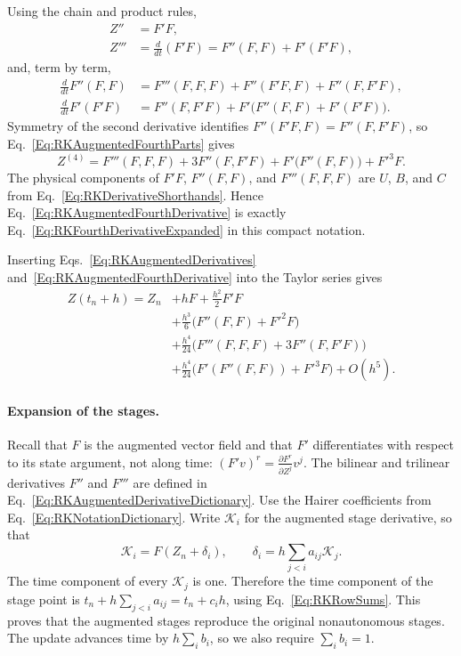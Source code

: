 Using the chain and product rules,
\begin{align}
 Z''&=F'F,\nonumber\\
 Z'''&=\frac{d}{dt}(F'F)=F''(F,F)+F'(F'F),\label{Eq:RKAugmentedDerivatives}
\end{align}
and, term by term,
\begin{align}
 \frac{d}{dt}F''(F,F)
 &=F'''(F,F,F)+F''(F'F,F)+F''(F,F'F),\nonumber\\
 \frac{d}{dt}F'(F'F)
 &=F''(F,F'F)+F'\bigl(F''(F,F)+F'(F'F)\bigr).
 \label{Eq:RKAugmentedFourthParts}
\end{align}
Symmetry of the second derivative identifies
$F''(F'F,F)=F''(F,F'F)$, so Eq.~\ref{Eq:RKAugmentedFourthParts} gives
\begin{equation}\label{Eq:RKAugmentedFourthDerivative}
 Z^{(4)}=F'''(F,F,F)+3F''(F,F'F)+F'\bigl(F''(F,F)\bigr)+F'^3F.
\end{equation}
The physical components of $F'F$, $F''(F,F)$, and $F'''(F,F,F)$ are
$U$, $B$, and $C$ from Eq.~\ref{Eq:RKDerivativeShorthands}. Hence
Eq.~\ref{Eq:RKAugmentedFourthDerivative} is exactly
Eq.~\ref{Eq:RKFourthDerivativeExpanded} in this compact notation.

Inserting Eqs.~\ref{Eq:RKAugmentedDerivatives}
and~\ref{Eq:RKAugmentedFourthDerivative} into the Taylor series gives
\begin{equation}\label{Eq:RKExactAugmentedTaylor}
\begin{aligned}
 Z(t_n+h)=Z_n&+hF+\frac{h^2}{2}F'F\\
 &+\frac{h^3}{6}\bigl(F''(F,F)+F'^2F\bigr)\\
 &+\frac{h^4}{24}\bigl(F'''(F,F,F)+3F''(F,F'F)\bigr)\\
 &+\frac{h^4}{24}\bigl(F'(F''(F,F))+F'^3F\bigr)+O(h^5).
\end{aligned}
\end{equation}

\paragraph{Expansion of the stages.}
Recall that $F$ is the augmented vector field and that $F'$ differentiates
with respect to its state argument, not along time:
$(F'v)^r=\frac{\partial F^r}{\partial Z^j}v^j$.
The bilinear and trilinear derivatives $F''$ and $F'''$ are defined
in Eq.~\ref{Eq:RKAugmentedDerivativeDictionary}.
Use the Hairer coefficients from Eq.~\ref{Eq:RKNotationDictionary}.
Write $\mathcal K_i$ for the augmented stage derivative, so that
\begin{equation}\label{Eq:RKAugmentedStages}
 \mathcal K_i=F(Z_n+\delta_i),\qquad
 \delta_i=h\sum_{j<i}a_{ij}\mathcal K_j.
\end{equation}
The time component of every $\mathcal K_j$ is one. Therefore the time
component of the stage point is $t_n+h\sum_{j<i}a_{ij}=t_n+c_ih$,
using Eq.~\ref{Eq:RKRowSums}. This proves that the augmented stages
reproduce the original nonautonomous stages. The update advances time by
$h\sum_i b_i$, so we also require $\sum_i b_i=1$.

